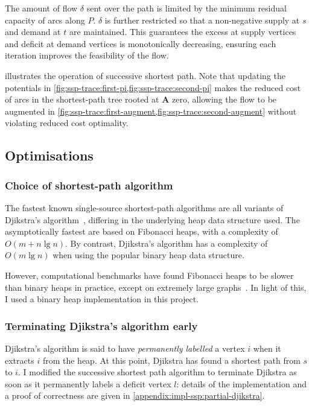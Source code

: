 The amount of flow $\delta$ sent over the path is limited by the minimum residual capacity of arcs along $P$. $\delta$ is further restricted so that a non-negative supply at $s$ and demand at $t$ are maintained. This guarantees the excess at supply vertices and deficit at demand vertices is monotonically decreasing, ensuring each iteration improves the feasibility of the flow.

 illustrates the operation of successive shortest path. Note that updating the potentials in \cref{fig:ssp-trace:first-pi,fig:ssp-trace:second-pi} makes the reduced cost of arcs in the shortest-path tree rooted at \textbf{A} zero, allowing the flow to be augmented in \cref{fig:ssp-trace:first-augment,fig:ssp-trace:second-augment} without violating reduced cost optimality.

\subsection{Optimisations} \label{sec:impl-ssp-optimisations}

\subsubsection{Choice of shortest-path algorithm}
The fastest known single-source shortest-path algorithms are all variants of Djikstra's algorithm~\cite[ch.~4]{Ahuja:1993}, differing in the underlying heap data structure used. The asymptotically fastest are based on Fibonacci heaps, with a complexity of $O(m + n\lg n)$. By contrast, Djikstra's algorithm has a complexity of $O(m\lg n)$ when using the popular binary heap data structure\footnotemark.

However, computational benchmarks have found Fibonacci heaps to be slower than binary heaps in practice, except on extremely large graphs~\cite[p.~15]{KiralyKovacs:2012}. In light of this, I used a binary heap implementation in this project.

\subsubsection{Terminating Djikstra's algorithm early}

Djikstra's algorithm is said to have \emph{permanently labelled} a vertex $i$ when it extracts $i$ from the heap. At this point, Djikstra has found a shortest path from $s$ to $i$. I modified the successive shortest path algorithm to terminate Djikstra as soon as it permanently labels a deficit vertex $l$: details of the implementation and a proof of correctness are given in \cref{appendix:impl-ssp:partial-djikstra}.

